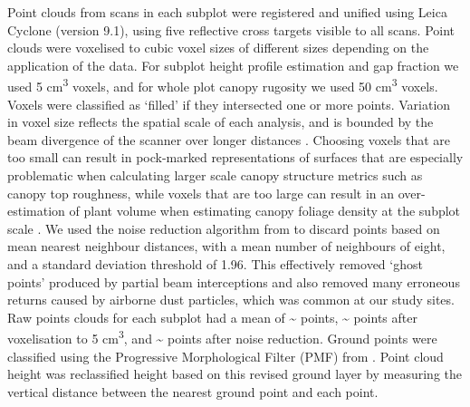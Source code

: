 \documentclass[11pt,a4paper]{article}
\begin{document}
Point clouds from scans in each subplot were registered and unified using Leica Cyclone (version 9.1), using five reflective cross targets visible to all scans. Point clouds were voxelised to cubic voxel sizes of different sizes depending on the application of the data. For subplot height profile estimation and gap fraction we used 5 cm\textsuperscript{3} voxels, and for whole plot canopy rugosity we used 50 cm\textsuperscript{3} voxels. Voxels were classified as `filled' if they intersected one or more points. Variation in voxel size reflects the spatial scale of each analysis, and is bounded by the beam divergence of the scanner over longer distances \citep{}. Choosing voxels that are too small can result in pock-marked representations of surfaces that are especially problematic when calculating larger scale canopy structure metrics such as canopy top roughness, while voxels that are too large can result in an over-estimation of plant volume when estimating canopy foliage density at the subplot scale \citep{Seidel2012, Cifuentes2014}. We used the noise reduction algorithm from \citet{Rusu2008} to discard points based on mean nearest neighbour distances, with a mean number of neighbours of eight, and a standard deviation threshold of 1.96. This effectively removed `ghost points' produced by partial beam interceptions and also removed many erroneous returns caused by airborne dust particles, which was common at our study sites. Raw points clouds for each subplot had a mean of \textasciitilde{}\rawpt{} points, \textasciitilde{}\voxelpt{} points after voxelisation to 5 cm\textsuperscript{3}, and \textasciitilde{}\subpt{} points after noise reduction. Ground points were classified using the Progressive Morphological Filter (PMF) from \citet{Zhang2003}. Point cloud height was reclassified height based on this revised ground layer by measuring the vertical distance between the nearest ground point and each point.
\end{document}
